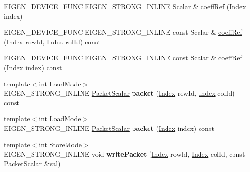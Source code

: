 \begin{DoxyCompactItemize}
\item 
E\+I\+G\+E\+N\+\_\+\+D\+E\+V\+I\+C\+E\+\_\+\+F\+U\+NC E\+I\+G\+E\+N\+\_\+\+S\+T\+R\+O\+N\+G\+\_\+\+I\+N\+L\+I\+NE Scalar \& \hyperlink{class_eigen_1_1_plain_object_base_a571632ed666076d7403c8bd3eece44f0}{coeff\+Ref} (\hyperlink{namespace_eigen_a62e77e0933482dafde8fe197d9a2cfde}{Index} index)
\item 
E\+I\+G\+E\+N\+\_\+\+D\+E\+V\+I\+C\+E\+\_\+\+F\+U\+NC E\+I\+G\+E\+N\+\_\+\+S\+T\+R\+O\+N\+G\+\_\+\+I\+N\+L\+I\+NE const Scalar \& \hyperlink{class_eigen_1_1_plain_object_base_ab1b33ee10e4c72ec5cf354d511900e62}{coeff\+Ref} (\hyperlink{namespace_eigen_a62e77e0933482dafde8fe197d9a2cfde}{Index} row\+Id, \hyperlink{namespace_eigen_a62e77e0933482dafde8fe197d9a2cfde}{Index} col\+Id) const
\item 
E\+I\+G\+E\+N\+\_\+\+D\+E\+V\+I\+C\+E\+\_\+\+F\+U\+NC E\+I\+G\+E\+N\+\_\+\+S\+T\+R\+O\+N\+G\+\_\+\+I\+N\+L\+I\+NE const Scalar \& \hyperlink{class_eigen_1_1_plain_object_base_a982b56223d011e2f836a3408983883d4}{coeff\+Ref} (\hyperlink{namespace_eigen_a62e77e0933482dafde8fe197d9a2cfde}{Index} index) const
\item 
\mbox{\label{class_eigen_1_1_plain_object_base_a85d505b93c18f4f558e9b80702e8e5af}} 
{\footnotesize template$<$int Load\+Mode$>$ }\\E\+I\+G\+E\+N\+\_\+\+S\+T\+R\+O\+N\+G\+\_\+\+I\+N\+L\+I\+NE \hyperlink{group___sparse_core___module}{Packet\+Scalar} {\bfseries packet} (\hyperlink{namespace_eigen_a62e77e0933482dafde8fe197d9a2cfde}{Index} row\+Id, \hyperlink{namespace_eigen_a62e77e0933482dafde8fe197d9a2cfde}{Index} col\+Id) const
\item 
\mbox{\label{class_eigen_1_1_plain_object_base_afdf71b005e354b8407b53dfd8aa7add2}} 
{\footnotesize template$<$int Load\+Mode$>$ }\\E\+I\+G\+E\+N\+\_\+\+S\+T\+R\+O\+N\+G\+\_\+\+I\+N\+L\+I\+NE \hyperlink{group___sparse_core___module}{Packet\+Scalar} {\bfseries packet} (\hyperlink{namespace_eigen_a62e77e0933482dafde8fe197d9a2cfde}{Index} index) const
\item 
\mbox{\label{class_eigen_1_1_plain_object_base_adb237a2cdcb37c6901ad15c7a9d87b1a}} 
{\footnotesize template$<$int Store\+Mode$>$ }\\E\+I\+G\+E\+N\+\_\+\+S\+T\+R\+O\+N\+G\+\_\+\+I\+N\+L\+I\+NE void {\bfseries write\+Packet} (\hyperlink{namespace_eigen_a62e77e0933482dafde8fe197d9a2cfde}{Index} row\+Id, \hyperlink{namespace_eigen_a62e77e0933482dafde8fe197d9a2cfde}{Index} col\+Id, const \hyperlink{group___sparse_core___module}{Packet\+Scalar} \&val)

\end{DoxyCompactItemize}
